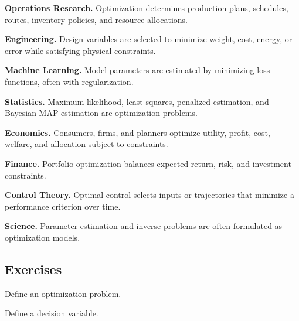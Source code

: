 \begin{applicationbox}

\textbf{Operations Research.}
Optimization determines production plans, schedules, routes, inventory
policies, and resource allocations.

\medskip

\textbf{Engineering.}
Design variables are selected to minimize weight, cost, energy, or error
while satisfying physical constraints.

\medskip

\textbf{Machine Learning.}
Model parameters are estimated by minimizing loss functions, often with
regularization.

\medskip

\textbf{Statistics.}
Maximum likelihood, least squares, penalized estimation, and Bayesian MAP
estimation are optimization problems.

\medskip

\textbf{Economics.}
Consumers, firms, and planners optimize utility, profit, cost, welfare,
and allocation subject to constraints.

\medskip

\textbf{Finance.}
Portfolio optimization balances expected return, risk, and investment
constraints.

\medskip

\textbf{Control Theory.}
Optimal control selects inputs or trajectories that minimize a performance
criterion over time.

\medskip

\textbf{Science.}
Parameter estimation and inverse problems are often formulated as
optimization models.

\end{applicationbox}

\subsection{Exercises}
\label{subsec:optimization-fundamentals-exercises}

\begin{exercise}[1]
Define an optimization problem.
\end{exercise}

\begin{exercise}[1]
Define a decision variable.
\end{exercise}

